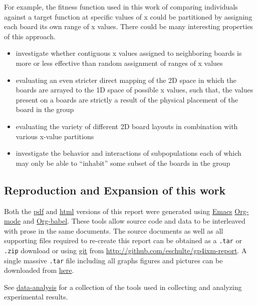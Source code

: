 \documentclass[11pt]{article}
\begin{document}
For example, the fitness function used in this work of comparing
individuals against a target function at specific values of x could be
partitioned by assigning each board its own range of x values.  There
could be many interesting properties of this approach.
\begin{itemize}
\item investigate whether contiguous x values assigned to neighboring
  boards is more or less effective than random assignment of ranges of
  x values
\item evaluating an even stricter direct mapping of the 2D space in which
  the boards are arrayed to the 1D space of possible x values, such
  that, the values present on a boards are strictly a result of the
  physical placement of the board in the group
\item evaluating the variety of different 2D board layouts in combination
  with various x-value partitions
\item investigate the behavior and interactions of subpopulations each of
  which may only be able to ``inhabit'' some subset of the boards in the
  group
\end{itemize}

\subsection*{Reproduction and Expansion of this work}
\label{sec-1.8}
\label{reproduction}

Both the \href{http://cs.unm.edu/~eschulte/classes/cs591-rpc/gp4ixm-report/report.pdf}{pdf} and \href{http://cs.unm.edu/~eschulte/classes/cs591-rpc/gp4ixm-report/report.html}{html} versions of this report were generated using
\href{http://www.gnu.org/software/emacs/}{Emacs} \href{http://orgmode.org/}{Org-mode} and \href{http://orgmode.org/worg/org-contrib/babel/org-babel.php}{Org-babel}.  These tools allow source code and data
to be interleaved with prose in the same documents.  The source
documents as well as all supporting files required to re-create this
report can be obtained as a \texttt{.tar} or \texttt{.zip} download or using \href{http://git-scm.com/}{git}
from \href{http://github.com/eschulte/gp4ixm-report}{http://github.com/eschulte/gp4ixm-report}.  A single massive
\texttt{.tar} file including all graphs figures and pictures can be
downloaded from \hyperref[somewhere]{here}.

See \href{file:///nfs/adaptive/eschulte/src/gp4ixm-report/data-analysis.org}{data-analysis} for a collection of the tools used in collecting and
analyzing experimental results.
\end{document}
